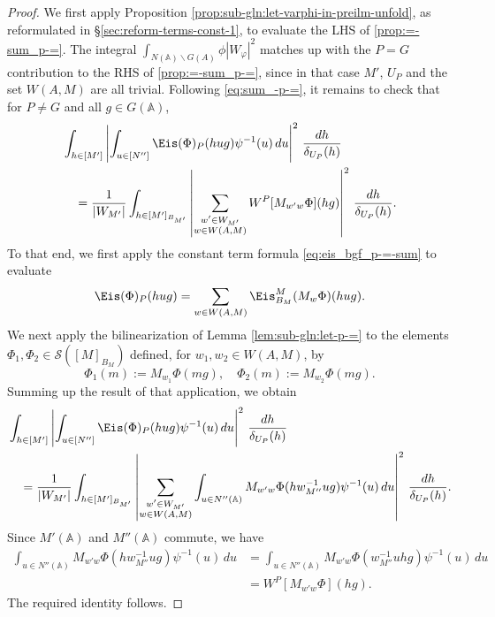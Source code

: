 \begin{proof}
  We first apply Proposition \ref{prop:sub-gln:let-varphi-in-preilm-unfold}, as reformulated in \S\ref{sec:reform-terms-const-1}, to evaluate the LHS of \eqref{prop:=-sum_p-=}.  The integral $\int_{N(\mathbb{A}) \backslash G(A)} \phi |W_\varphi|^2$ matches up with the $P = G$ contribution to the RHS of \eqref{prop:=-sum_p-=}, since in that case $M'$, $U_P$ and the set $W(A,M)$ are all trivial.  Following \eqref{eq:sum_-p-=}, it remains to check that for $P \neq G$ and all $g \in G(\mathbb{A})$,
  \begin{align*}
    &\int_{h \in [M']}
      \left\lvert
      \int_{u \in [N'']}
      \Eis(\Phi)_P(h u g) \psi^{-1}(u) \, d u
      \right\rvert^2 \, \frac{d h}{\delta_{U_P}(h)} \\
    &\quad =
      \frac{1}{|W_{M'}|}
      \int_{h \in [M']_{B_{M'}}}
      \left\lvert
      \sum_{
      \substack{
      w' \in W_{M'}  \\
    w \in W(A,M)
    }
    }
    W^P[M_{w' w} \Phi](h g)
    \right\rvert^2
    \, \frac{d h}{\delta_{U_P}(h)}.
  \end{align*}
  To that end, we first apply the constant term formula \eqref{eq:eis_bgf_p-=-sum} to evaluate
  \begin{equation*}
    \Eis(\Phi)_P(h u g)
    = \sum_{w \in W(A,M)} \Eis_{B_M}^M(M_w \Phi)(h u g).
  \end{equation*}
  We next apply the bilinearization of Lemma \ref{lem:sub-gln:let-p-=} to the elements $\Phi_1, \Phi_2 \in \mathcal{S}([M]_{B_M})$ defined, for $w_1, w_2 \in W(A,M)$, by
  \begin{equation*}
    \Phi_1(m) :=  M_{w_1} \Phi(m g), \quad
    \Phi_2(m) :=  M_{w_2} \Phi(m g).
  \end{equation*}
  Summing up the result of that application, we obtain
  \begin{align*}
    &\int_{h \in [M']}
      \left\lvert
      \int_{u \in [N'']}
      \Eis(\Phi)_P(h u g) \psi^{-1}(u) \, d u
      \right\rvert^2 \, \frac{d h}{\delta_{U_P}(h)} \\
    &\quad =
      \frac{1}{|W_{M'}|}
      \int_{h \in [M']_{B_{M'}}}
      \left\lvert
      \sum_{
      \substack{
      w' \in W_{M'}  \\
    w \in W(A,M)
    }
    }
    \int_{u \in N''(\mathbb{A})}
    M_{w' w} \Phi (h w_{M''}^{-1} u g)
    \psi^{-1}(u) \, d u
    \right\rvert^2
    \, \frac{d h}{\delta_{U_P}(h)}.
  \end{align*}
  Since $M'(\mathbb{A})$ and $M''(\mathbb{A})$ commute, we have
  \begin{align*}
    \int_{u \in N''(\mathbb{A})}
    M_{w' w} \Phi (h w_{M''}^{-1} u g)
    \psi^{-1}(u) \, d u
    &=
      \int_{u \in N''(\mathbb{A})}
      M_{w' w} \Phi (w_{M''}^{-1} u h g)
      \psi^{-1}(u) \, d u \\
    &= W^P[M_{w' w} \Phi](h g).
  \end{align*}
  The required identity follows.
\end{proof}



